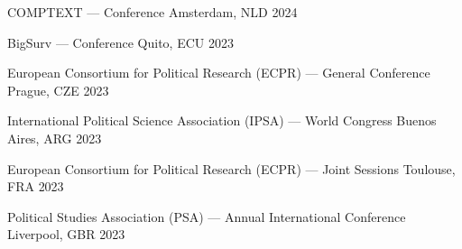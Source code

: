 

\begin{cvhonors}
\cvconf
{COMPTEXT --- Conference} 
{Amsterdam, NLD}
{2024}
\end{cvhonors}

\begin{cvhonors}
\cvconf
{BigSurv --- Conference} 
{Quito, ECU}
{2023}
\end{cvhonors}

\begin{cvhonors}
\cvconf
{European Consortium for Political Research (ECPR) --- General Conference} 
{Prague, CZE}
{2023}
\end{cvhonors}

\begin{cvhonors}
\cvconf
{International Political Science Association (IPSA) --- World Congress} 
{Buenos Aires, ARG}
{2023}
\end{cvhonors}



\begin{cvhonors}
\cvconf
{European Consortium for Political Research (ECPR) --- Joint Sessions} 
{Toulouse, FRA}
{2023}
\end{cvhonors}

\begin{cvhonors}
\cvconf
{Political Studies Association (PSA) --- Annual International Conference} 
{Liverpool, GBR}
{2023}
\end{cvhonors}


